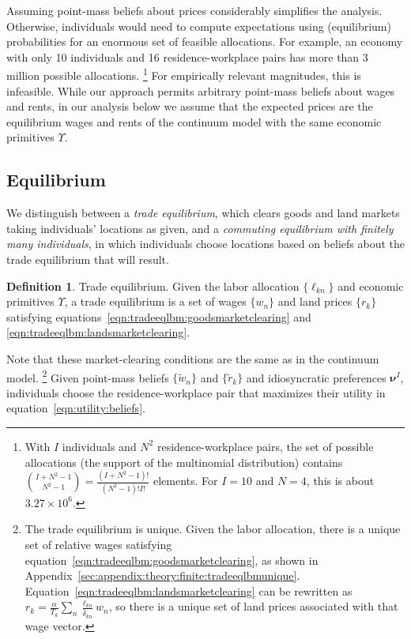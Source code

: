 \documentclass[11pt]{article}
\theoremstyle{definition}
\newtheorem{definition}{Definition}[section]
\begin{document}
Assuming point-mass beliefs about prices considerably simplifies the analysis.
Otherwise, individuals would need to compute expectations using (equilibrium) probabilities for an enormous set of feasible allocations.
For example, an economy with only 10 individuals and 16 residence-workplace pairs has more than 3 million possible allocations.%
\footnote{With $I$ individuals and $N^2$ residence-workplace pairs,
the set of possible allocations (the support of the multinomial distribution) contains
$\binom{I + N^2 - 1}{N^2 - 1} =  \frac{(I + N^2 -1)!}{(N^2 - 1)!I!}$
elements. For $I=10$ and $N=4$, this is about $3.27 \times 10^{6}$.}
For empirically relevant magnitudes, this is infeasible.
While our approach permits arbitrary point-mass beliefs about wages and rents,
in our analysis below we assume that the expected prices are the equilibrium wages and rents of the continuum model with the same economic primitives $\Upsilon$.

\subsection{Equilibrium}

We distinguish between
a \textit{trade equilibrium}, which clears goods and land markets taking individuals' locations as given,
and a \textit{commuting equilibrium with finitely many individuals},
in which individuals choose locations
based on beliefs about the trade equilibrium that will result.
\begin{definition}{Trade equilibrium.} \label{def:tradeequilibrium}
Given the labor allocation $\{\ell_{kn}\}$ and economic primitives $\Upsilon$,
a trade equilibrium is a set of wages $\{w_n\}$ and land prices $\{r_k\}$
satisfying
equations~\eqref{eqn:tradeeqlbm:goodsmarketclearing} and \eqref{eqn:tradeeqlbm:landsmarketclearing}.
\end{definition}
\noindent Note that these market-clearing conditions are the same as in the continuum model.%
\footnote{
The trade equilibrium is unique.
Given the labor allocation,
there is a unique set of relative wages satisfying equation~\eqref{eqn:tradeeqlbm:goodsmarketclearing},
as shown in Appendix~\ref{sec:appendix:theory:finite:tradeeqlbmunique}.
Equation~\eqref{eqn:tradeeqlbm:landsmarketclearing} can be rewritten as
$r_k = \frac{\alpha}{T_k} \sum_n \frac{\ell_{kn}}{\bar{\delta}_{kn}} w_n$,
so there is a unique set of land prices associated with that wage vector.
}
Given point-mass beliefs $\{\tilde{w}_{n}\}$ and $\{\tilde{r}_{k}\}$
and idiosyncratic preferences $\boldsymbol \nu^{I}$,
individuals choose the residence-workplace pair that maximizes their utility in equation~\eqref{eqn:utility:beliefs}.
\end{document}
